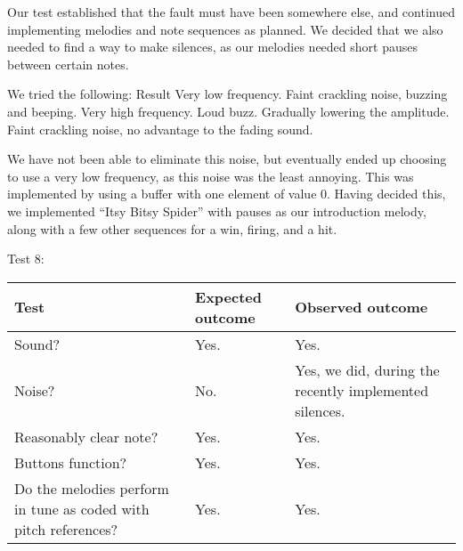 Our test established that the fault must have been somewhere else, and
continued implementing melodies and note sequences as planned. We
decided that we also needed to find a way to make silences, as our
melodies needed short pauses between certain notes.

We tried the following:					Result
Very low frequency.						Faint crackling noise, buzzing and beeping.
Very high frequency.					Loud buzz.
Gradually lowering the amplitude.		Faint crackling noise, no advantage to the fading sound.

We have not been able to eliminate this noise, but eventually ended up
choosing to use a very low frequency, as this noise was the least
annoying. This was implemented by using a buffer with one element of
value 0. Having decided this, we implemented ``Itsy Bitsy Spider'' with
pauses as our introduction melody, along with a few other sequences for
a win, firing, and a hit.

Test 8:
\begin{center}
\begin{tabular}{|p{3.6cm}|p{3.6cm}|p{3.6cm}|}
\hline
{\sc Test} & {\sc Expected outcome} & {\sc Observed outcome}\\ \hline
Sound? & Yes. & Yes. \\ \hline
Noise? & No. & Yes, we did, during the recently implemented silences. \\
\hline
Reasonably clear note? & Yes. & Yes. \\ \hline
Buttons function? & Yes. & Yes. \\ \hline
Do the melodies perform in tune as coded with pitch references? & Yes. &
Yes. \\ \hline
\end{tabular}
\end{center}
